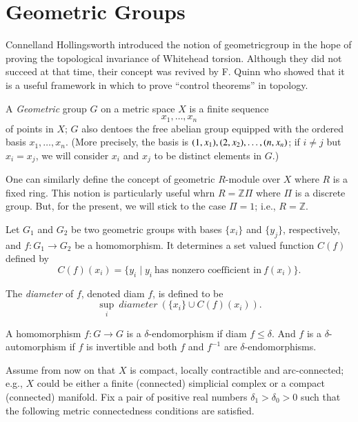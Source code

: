 \chapter{Geometric Groups}\label{c9}

Connell\pageoriginale and Hollingsworth \cite{20} introduced the
notion of geometric\break group in the hope of proving the topological
invariance of Whitehead torsion. Although they did not succeed at that
time, their concept was revived by F. Quinn \cite{84} who showed that
it is a useful framework in which to prove ``control theorems'' in
topology. 

A \textit{Geometric} group $G$ on a metric space $X$ is a finite
sequence 
$$
x_1, \ldots , x_n
$$ 
of points in $X$; $G$ also dentoes the
free abelian group equipped with the ordered basis $x_1, \ldots ,
x_n$. (More precisely, the basis is $(1, x_1), (2, x_2), \ldots ,\break (n,
x_n)$; if $i \neq j$ but $x_i = x_j$, we will consider $x_i$ and $x_j$
to be distinct elements in $G$.)

\begin{remark*}
  One can similarly define the concept of geometric $R$-module over
  $X$ where $R$ is a fixed ring. This notion is particularly useful
  whrn $R= \mathbb{Z} \Pi$ where $\Pi$ is a discrete group. But, for
  the present, we will stick to the case $\Pi = 1$; i.e., $R= \mathbb{Z}$.
\end{remark*}

Let $G_1$ and $G_2$ be two geometric groups with bases $\{ x_i\}$ and
$\{y_j\}$, respectively, and $f: G_1 \to G_2$ be a homomorphism. It
determines a set valued function $C(f)$ defined by 
$$
  C(f) (x_i)= \{ y_i \mid y_i ~\text{has nonzero coefficient in}~ f(x_i)\}.
$$

The \textit{diameter} of $f$, denoted diam $f$, is defined to be
$$
\sup\limits_{i} ~diameter~ (\{ x_i \} \cup C(f)(x_i)).
$$

\begin{defi}\label{c9:defi9.1}
  A homomorphism $f: G \to G$ is a $\delta$-endomorphism if diam $f
  \leq \delta$. And $f$ is a $\delta$-automorphism if $f$ is
  invertible and both $f$ and $f^{-1}$ are $\delta$-endomorphisms.
\end{defi}

Assume from now on that $X$ is compact, locally contractible and
arc-connected; e.g., $X$ could be either a finite (connected)
simplicial complex or a compact (connected) manifold. Fix a pair of
positive real numbers $\delta_1 > \delta_0 > 0$ such that the
following metric connectedness conditions are satisfied.

